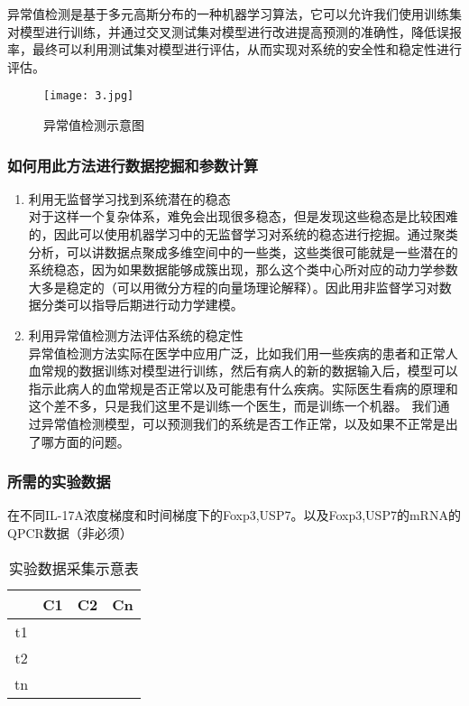 \documentclass[withoutpreface,bwprint]{cumcmthesis} %
\begin{document}
异常值检测是基于多元高斯分布的一种机器学习算法，它可以允许我们使用训练集对模型进行训练，并通过交叉测试集对模型进行改进提高预测的准确性，降低误报率，最终可以利用测试集对模型进行评估，从而实现对系统的安全性和稳定性进行评估。
\begin{figure}[!h]
	\centering
	\texttt{[image: 3.jpg]}
	\caption{异常值检测示意图}
\end{figure}

\subsubsection{如何用此方法进行数据挖掘和参数计算}
\begin{enumerate}[itemindent=2em]
	\item 利用无监督学习找到系统潜在的稳态\\
	 \qquad 对于这样一个复杂体系，难免会出现很多稳态，但是发现这些稳态是比较困难的，因此可以使用机器学习中的无监督学习对系统的稳态进行挖掘。通过聚类分析，可以讲数据点聚成多维空间中的一些类，这些类很可能就是一些潜在的系统稳态，因为如果数据能够成簇出现，那么这个类中心所对应的动力学参数大多是稳定的（可以用微分方程的向量场理论解释）。因此用非监督学习对数据分类可以指导后期进行动力学建模。
	\item 利用异常值检测方法评估系统的稳定性\\
	 \qquad 异常值检测方法实际在医学中应用广泛，比如我们用一些疾病的患者和正常人血常规的数据训练对模型进行训练，然后有病人的新的数据输入后，模型可以指示此病人的血常规是否正常以及可能患有什么疾病。实际医生看病的原理和这个差不多，只是我们这里不是训练一个医生，而是训练一个机器。
	我们通过异常值检测模型，可以预测我们的系统是否工作正常，以及如果不正常是出了哪方面的问题。
\end{enumerate}
\subsubsection{所需的实验数据}
在不同IL-17A浓度梯度和时间梯度下的Foxp3,USP7。以及Foxp3,USP7的mRNA的QPCR数据（非必须）

\begin{table}[htb]
	\centering
	\caption{实验数据采集示意表}\label{tab:one}
	\begin{tabular}{|c|c|c|c|}
		\hline
		     & C1 & C2 & Cn \\ \hline
		  t1 &    &    &    \\ \hline
		  t2 &    &    &    \\ \hline
		  tn &    &    &    \\ \hline
		\end{tabular}
	\end{table}
\end{document}
